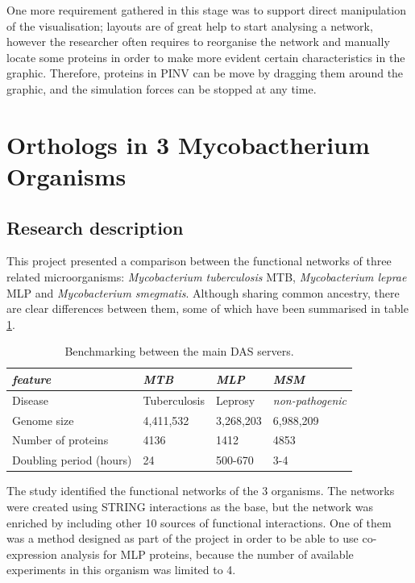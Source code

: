 One more requirement gathered in this stage was to support direct manipulation of the visualisation; layouts are of great help to start analysing a network, however the researcher often requires to reorganise the network and manually locate some proteins in order to make more evident certain characteristics in the graphic. Therefore, proteins in PINV can be move by dragging them around the graphic, and the simulation forces can be stopped at any time.

\section{Orthologs in 3 Mycobactherium Organisms}\label{sec:orthologs}
\subsection{Research description}
This project presented a comparison between the functional networks of three related microorganisms: \emph{Mycobacterium tuberculosis} MTB, \emph{Mycobacterium leprae} MLP and \emph{Mycobacterium smegmatis}. Although sharing common ancestry, there are clear differences between them, some of which have been summarised in table \ref{tab:orthologs}.


\begin{table}[!ht]
        \begin{tabular}{|p{6cm}|p{3cm}|p{3cm}|p{3cm}|}
\hline 
\emph{feature} & \emph{MTB} & \emph{MLP} & \emph{MSM}\\
\hline 
Disease & Tuberculosis & Leprosy & \emph{non-pathogenic}\\
\hline 
Genome size & 4,411,532 & 3,268,203 & 6,988,209\\
\hline 
Number of proteins & 4136 & 1412 & 4853\\
\hline 
Doubling period (hours) & 24  & 500-670 & 3-4 \\
\hline 
        \end{tabular}
        \caption{Benchmarking between the main DAS servers.}
        \label{tab:orthologs}
\end{table}

The study identified the functional networks of the 3 organisms. The networks were created using STRING interactions as the base, but the network was enriched by including other 10 sources of functional interactions. One of them was a method designed as part of the project in order to be able to use co-expression analysis for MLP proteins, because the number of available experiments in this organism was limited to 4.

